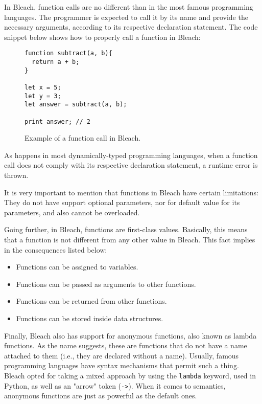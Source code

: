 In Bleach, function calls are no different than in the most famous programming languages. The programmer is expected to call it by its name and provide the necessary arguments, according to its respective declaration statement. The code snippet below shows how to properly call a function in Bleach:

\begin{figure}[H]
    \centering
    \begin{lstlisting}
function subtract(a, b){
  return a + b;
}

let x = 5;
let y = 3;
let answer = subtract(a, b);

print answer; // 2
    \end{lstlisting}
    \caption{Example of a function call in Bleach.}
\end{figure}

As happens in most dynamically-typed programming languages, when a function call does not comply with its respective declaration statement, a runtime error is thrown.

It is very important to mention that functions in Bleach have certain limitations: They do not have support optional parameters, nor for default value for its parameters, and also cannot be overloaded.

Going further, in Bleach, functions are first-class values. Basically, this means that a function is not different from any other value in Bleach. This fact implies in the consequences listed below:

\begin{itemize}
    \item Functions can be assigned to variables.
    \item Functions can be passed as arguments to other functions.
    \item Functions can be returned from other functions.
    \item Functions can be stored inside data structures.
\end{itemize}

Finally, Bleach also has support for anonymous functions, also known as lambda functions. As the name suggests, these are functions that do not have a name attached to them (i.e., they are declared without a name). Usually, famous programming languages have syntax mechanisms that permit such a thing. Bleach opted for taking a mixed approach by using the \texttt{lambda} keyword, used in Python, as well as an "arrow" token (\texttt{->}). When it comes to semantics, anonymous functions are just as powerful as the default ones.

